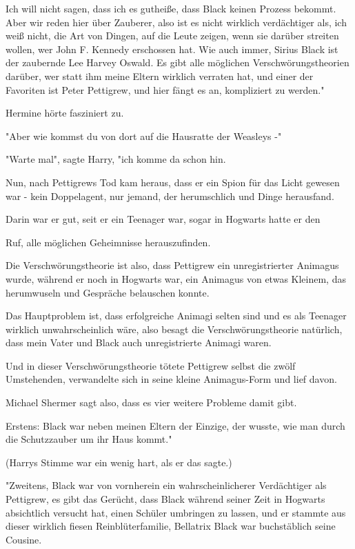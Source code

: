 {Ich will nicht sagen, dass ich es gutheiße, dass Black keinen Prozess bekommt. Aber wir reden hier über Zauberer, also ist es nicht wirklich verdächtiger als, ich weiß nicht, die Art von Dingen, auf die Leute zeigen, wenn sie darüber streiten wollen, wer John F. Kennedy erschossen hat. Wie auch immer, Sirius Black ist der zaubernde Lee Harvey Oswald. Es gibt alle möglichen Verschwörungstheorien darüber, wer statt ihm meine Eltern wirklich verraten hat, und einer der Favoriten ist Peter Pettigrew, und hier fängt es an, kompliziert zu werden."

Hermine hörte fasziniert zu.

"Aber wie kommst du von dort auf die Hausratte der Weasleys -"

"Warte mal", sagte Harry, "ich komme da schon hin.

Nun, nach Pettigrews Tod kam heraus, dass er ein Spion für das Licht gewesen war - kein Doppelagent, nur jemand, der herumschlich und Dinge herausfand.

Darin war er gut, seit er ein Teenager war, sogar in Hogwarts hatte er den

Ruf, alle möglichen Geheimnisse herauszufinden.

Die Verschwörungstheorie ist also, dass Pettigrew ein unregistrierter Animagus wurde, während er noch in Hogwarts war, ein Animagus von etwas Kleinem, das herumwuseln und Gespräche belauschen konnte.

Das Hauptproblem ist, dass erfolgreiche Animagi selten sind und es als Teenager wirklich unwahrscheinlich wäre, also besagt die Verschwörungstheorie natürlich, dass mein Vater und Black auch unregistrierte Animagi waren.

Und in dieser Verschwörungstheorie tötete Pettigrew selbst die zwölf Umstehenden, verwandelte sich in seine kleine Animagus-Form und lief davon.

Michael Shermer sagt also, dass es vier weitere Probleme damit gibt.

Erstens: Black war neben meinen Eltern der Einzige, der wusste, wie man durch die Schutzzauber um ihr Haus kommt."

(Harrys Stimme war ein wenig hart, als er das sagte.)

"Zweitens, Black war von vornherein ein wahrscheinlicherer Verdächtiger als Pettigrew, es gibt das Gerücht, dass Black während seiner Zeit in Hogwarts absichtlich versucht hat, einen Schüler umbringen zu lassen, und er stammte aus dieser wirklich fiesen Reinblüterfamilie, Bellatrix Black war buchstäblich seine Cousine.

}
